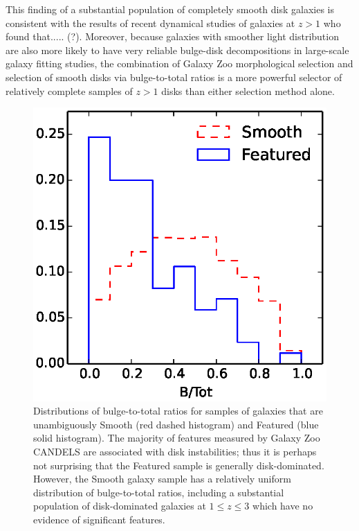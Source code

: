 \documentclass[useAMS,usenatbib]{mn2e}
\def\notecsm	{\color{titlecol2}}
\begin{document}
{This finding of a substantial population of completely smooth disk galaxies is consistent with the results of recent dynamical studies of galaxies at $z > 1$ \citep[e.g.][]{wisnioski15} {\notecsm who found that..... (?)}. Moreover, because galaxies with smoother light distribution are also more likely to have very reliable bulge-disk decompositions in large-scale galaxy fitting studies, the combination of Galaxy Zoo morphological selection and selection of smooth disks via bulge-to-total ratios is a more powerful selector of relatively complete samples of $z > 1$ disks than either selection method alone.

\begin{figure}
\includegraphics[scale=0.85]{BTot_histogram.eps}
\caption{
Distributions of bulge-to-total ratios for samples of galaxies that are unambiguously Smooth (red dashed histogram) and Featured (blue solid histogram). The majority of features measured by Galaxy Zoo CANDELS are associated with disk instabilities; thus it is perhaps not surprising that the Featured sample is generally disk-dominated. However, the Smooth galaxy sample has a relatively uniform distribution of bulge-to-total ratios, including a substantial population of disk-dominated galaxies at $1 \leq z \leq 3$ which have no evidence of significant features.
}
\label{fig:btot}
\end{figure}




}
\end{document}
